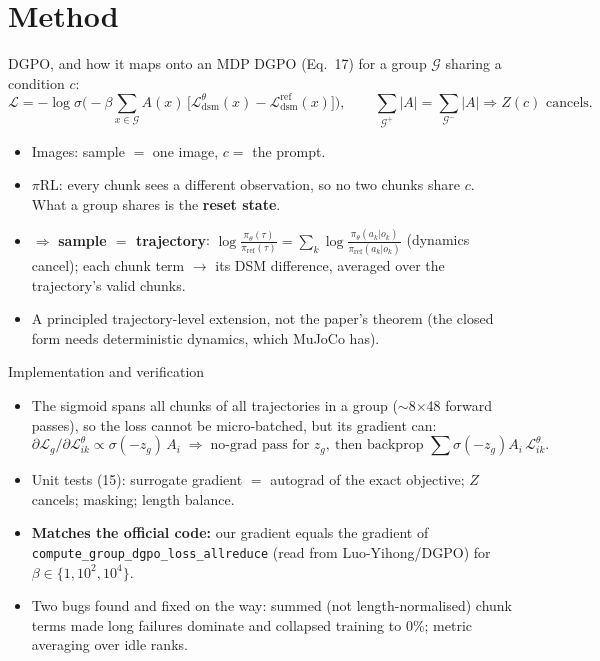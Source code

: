 \documentclass[aspectratio=169,11pt]{beamer}
\newcommand{\pirl}{$\pi$RL}
\begin{document}
\section{Method}
\begin{frame}{DGPO, and how it maps onto an MDP}
  \small
  DGPO (Eq.~17) for a group $\mathcal G$ sharing a condition $c$:
  \[
    \mathcal L = -\log\sigma\!\Big(-\beta \textstyle\sum_{x\in\mathcal G} A(x)\,
      \big[\mathcal L^{\theta}_{\text{dsm}}(x) - \mathcal L^{\text{ref}}_{\text{dsm}}(x)\big]\Big),
    \qquad \textstyle\sum_{\mathcal G^+}|A| = \sum_{\mathcal G^-}|A| \Rightarrow Z(c)\text{ cancels.}
  \]
  \begin{itemize}
    \item Images: sample $=$ one image, $c=$ the prompt.
    \item \pirl: every chunk sees a different observation, so no two chunks share $c$.
          What a group shares is the \textbf{reset state}.
    \item $\Rightarrow$ \textbf{sample $=$ trajectory}: $\log\frac{\pi_\theta(\tau)}{\pi_{\text{ref}}(\tau)}
          = \sum_k \log\frac{\pi_\theta(a_k|o_k)}{\pi_{\text{ref}}(a_k|o_k)}$ (dynamics cancel);
          each chunk term $\to$ its DSM difference, averaged over the trajectory's valid chunks.
    \item A principled trajectory-level extension, not the paper's theorem
          (the closed form needs deterministic dynamics, which MuJoCo has).
  \end{itemize}
\end{frame}

\begin{frame}{Implementation and verification}
  \small
  \begin{itemize}
    \item The sigmoid spans all chunks of all trajectories in a group ($\sim$8$\times$48 forward passes),
          so the loss cannot be micro-batched, but its gradient can:
          \[ \partial\mathcal L_g/\partial \mathcal L^{\theta}_{ik} \propto \sigma(-z_g)\,A_i
             \;\Rightarrow\; \text{no-grad pass for } z_g,\ \text{then backprop } \textstyle\sum \sigma(-z_g)A_i\,\mathcal L^\theta_{ik}. \]
    \item Unit tests (15): surrogate gradient $=$ autograd of the exact objective; $Z$ cancels;
          masking; length balance.
    \item \textbf{Matches the official code:} our gradient equals the gradient of
          \texttt{compute\_group\_dgpo\_loss\_allreduce} (read from Luo-Yihong/DGPO) for
          $\beta\in\{1,10^2,10^4\}$.
    \item Two bugs found and fixed on the way: summed (not length-normalised) chunk terms made long
          failures dominate and collapsed training to 0\%; metric averaging over idle ranks.
  \end{itemize}
\end{frame}
\end{document}
